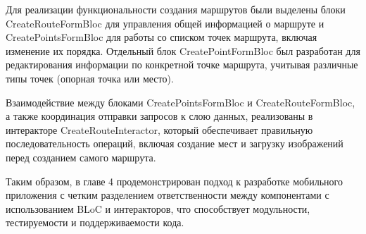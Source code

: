 Для реализации функциональности создания маршрутов были выделены блоки CreateRouteFormBloc  для управления общей информацией о маршруте и CreatePointsFormBloc  для работы со списком точек маршрута, включая изменение их порядка. Отдельный блок CreatePointFormBloc  был разработан для редактирования информации по конкретной точке маршрута, учитывая различные типы точек (опорная точка или место).  

Взаимодействие между блоками CreatePointsFormBloc и CreateRouteFormBloc, а также координация отправки запросов к слою данных, реализованы в интеракторе CreateRouteInteractor, который обеспечивает правильную последовательность операций, включая создание мест и загрузку изображений перед созданием самого маршрута.  

Таким образом, в главе 4 продемонстрирован подход к разработке мобильного приложения с четким разделением ответственности между компонентами с использованием BLoC и интеракторов, что способствует модульности, тестируемости и поддерживаемости кода.


